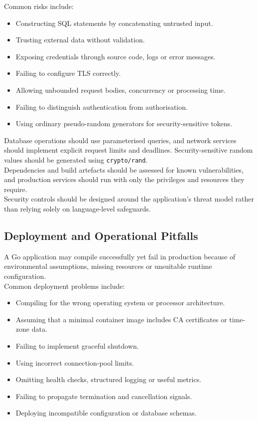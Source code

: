Common risks include:

\begin{itemize}
    \item Constructing SQL statements by concatenating untrusted input.
    \item Trusting external data without validation.
    \item Exposing credentials through source code, logs or error messages.
    \item Failing to configure TLS correctly.
    \item Allowing unbounded request bodies, concurrency or processing time.
    \item Failing to distinguish authentication from authorisation.
    \item Using ordinary pseudo-random generators for security-sensitive tokens.
\end{itemize}

Database operations should use parameterised queries, and network services should implement explicit request limits and deadlines. Security-sensitive random values should be generated using \texttt{crypto/rand}.\\

Dependencies and build artefacts should be assessed for known vulnerabilities, and production services should run with only the privileges and resources they require.\\

Security controls should be designed around the application's threat model rather than relying solely on language-level safeguards.

\subsection{Deployment and Operational Pitfalls}

A Go application may compile successfully yet fail in production because of environmental assumptions, missing resources or unsuitable runtime configuration.\\

Common deployment problems include:

\begin{itemize}
    \item Compiling for the wrong operating system or processor architecture.
    \item Assuming that a minimal container image includes CA certificates or time-zone data.
    \item Failing to implement graceful shutdown.
    \item Using incorrect connection-pool limits.
    \item Omitting health checks, structured logging or useful metrics.
    \item Failing to propagate termination and cancellation signals.
    \item Deploying incompatible configuration or database schemas.
\end{itemize}

